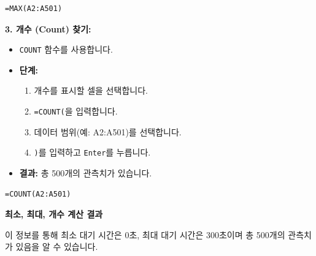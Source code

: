 \documentclass[11pt,a4paper]{book}
\providecommand{\captionof}[2]{\textbf{#2}}
\theoremstyle{definition}
\begin{document}
\begin{tcolorbox}[title={최소값, 최대값, 개수 찾기 (Finding Min, Max, Count)}]
\begin{lstlisting}[caption={Excel MAX 함수 사용 예시}, label={lst:excel_max}]
=MAX(A2:A501)
\end{lstlisting}

\textbf{3. 개수 (Count) 찾기:}
\begin{itemize}
    \item \texttt{COUNT} 함수를 사용합니다.
    \item \textbf{단계:}
    \begin{enumerate}
        \item 개수를 표시할 셀을 선택합니다.
        \item \texttt{=COUNT(}을 입력합니다.
        \item 데이터 범위(예: A2:A501)를 선택합니다.
        \item \texttt{)}를 입력하고 \texttt{Enter}를 누릅니다.
    \end{enumerate}
    \item \textbf{결과:} 총 500개의 관측치가 있습니다.
\end{itemize}

\begin{lstlisting}[caption={Excel COUNT 함수 사용 예시}, label={lst:excel_count}]
=COUNT(A2:A501)
\end{lstlisting}

\begin{center}
\captionof{figure}{최소, 최대, 개수 계산 결과}
\label{fig:excel_min_max_count_results}
\end{center}
이 정보를 통해 최소 대기 시간은 0초, 최대 대기 시간은 300초이며 총 500개의 관측치가 있음을 알 수 있습니다.
\end{tcolorbox}
\end{document}
